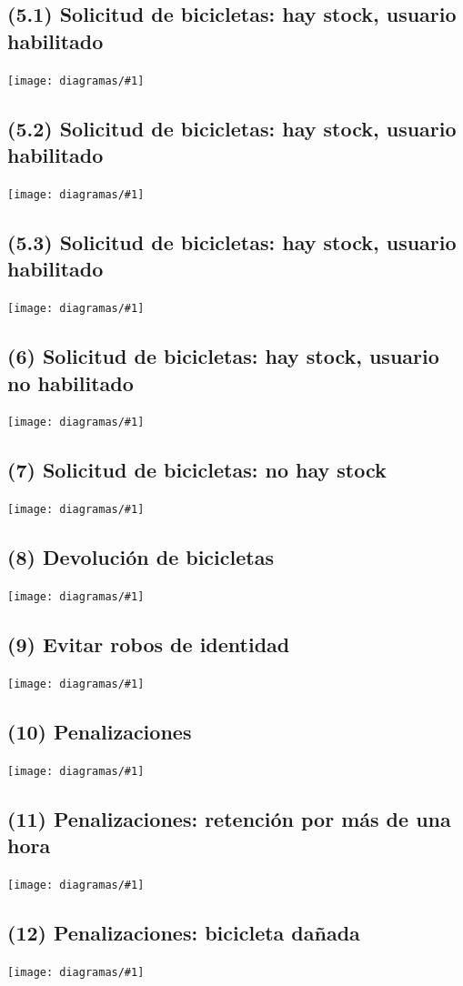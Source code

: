 \documentclass[a4paper, 10pt, twoside]{article}
\newcommand{\diagramav}[1]{
  \texttt{[image: diagramas/\#1]}
}
\begin{document}
\subsection{(5.1)  Solicitud de bicicletas: hay stock, usuario habilitado}
\diagramav{objetivos-5.1}

\subsection{(5.2)  Solicitud de bicicletas: hay stock, usuario habilitado}
\diagramav{objetivos-5.2}

\subsection{(5.3)  Solicitud de bicicletas: hay stock, usuario habilitado}
\diagramav{objetivos-5.3}

\subsection{(6)    Solicitud de bicicletas: hay stock, usuario no habilitado}
\diagramav{objetivos-6}

\subsection{(7)    Solicitud de bicicletas: no hay stock}
\diagramav{objetivos-7}

\subsection{(8)    Devolución de bicicletas}
\diagramav{objetivos-8}

\subsection{(9)    Evitar robos de identidad}
\diagramav{objetivos-9}

\subsection{(10)   Penalizaciones}
\diagramav{objetivos-10}

\subsection{(11)   Penalizaciones: retención por más de una hora}
\diagramav{objetivos-11}

\subsection{(12)   Penalizaciones: bicicleta dañada}
\diagramav{objetivos-12}
\end{document}
